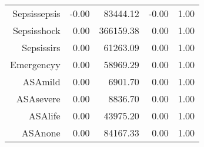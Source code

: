 \begin{tabular}{rrrrr}
$$  Sepsis\-sepsis & -0.00 & 83444.12 & -0.00 & 1.00 \\ 
  Sepsis\-shock & 0.00 & 366159.38 & 0.00 & 1.00 \\ 
  Sepsis\-sirs & 0.00 & 61263.09 & 0.00 & 1.00 \\ 
  Emergency\-y & 0.00 & 58969.29 & 0.00 & 1.00 \\ 
  ASA\-mild & 0.00 & 6901.70 & 0.00 & 1.00 \\ 
  ASA\-severe & 0.00 & 8836.70 & 0.00 & 1.00 \\ 
  ASA\-life & 0.00 & 43975.20 & 0.00 & 1.00 \\ 
  ASA\-none & 0.00 & 84167.33 & 0.00 & 1.00 \\ 
   \hline
\end{tabular}

